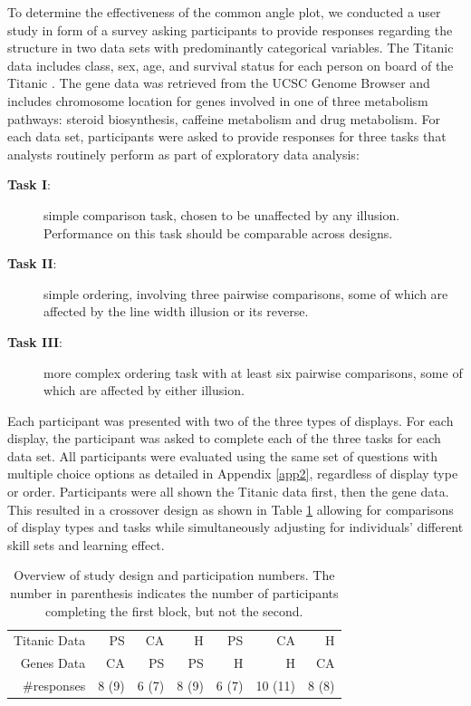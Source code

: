 To determine the effectiveness of the common angle plot, we conducted a user study in form of a survey asking participants to provide responses regarding the structure in two data sets with predominantly categorical variables. The Titanic data  includes class, sex, age, and survival status for each person on board of the Titanic \cite{titanic}. The gene data  was retrieved from the UCSC Genome Browser \cite{ucsc:2002} and includes chromosome location for genes involved in one of three metabolism pathways: steroid biosynthesis, caffeine metabolism and drug metabolism.
For each data set, participants were asked to provide responses for three tasks that analysts routinely perform as part of exploratory data analysis:
\begin{description}
\item[{\bf Task I}:] simple comparison task, chosen to be unaffected by any illusion. Performance on this task should be comparable across designs.
\item[{\bf Task II}:] simple ordering, involving three pairwise comparisons, some of which are affected by the line width illusion or its reverse. 

\item[{\bf Task III}:] more complex ordering task with at least six pairwise comparisons, some of which are affected by either illusion.
 \end{description}
 
Each participant was presented with two of the three types of displays. For each display, the participant was asked to complete each of the three tasks for each data set. All participants were evaluated using the same set of questions with multiple choice options as detailed in Appendix \ref{app2}, regardless of display type or order. Participants were all shown the Titanic data first, then the gene data.  %
This resulted in a crossover design as shown in Table \ref{tab:designs} allowing for comparisons of display types and tasks while  simultaneously adjusting for individuals' different skill sets and learning effect.

\begin{table}[htbp]
\centering
\begin{tabular}{rrrrrrr}
Titanic Data & PS & CA & H & PS & CA & H \\ 
Genes Data & CA & PS & PS & H& H & CA \\ \hline
\#responses &  8 (9) &  6 (7) &  8 (9) &  6 (7) & 10 (11) & 8 (8)\\ 
\end{tabular}
\caption{\label{tab:designs} Overview of study design and participation numbers. The number in parenthesis indicates the number of participants completing the first block, but not the second.}
\end{table}



